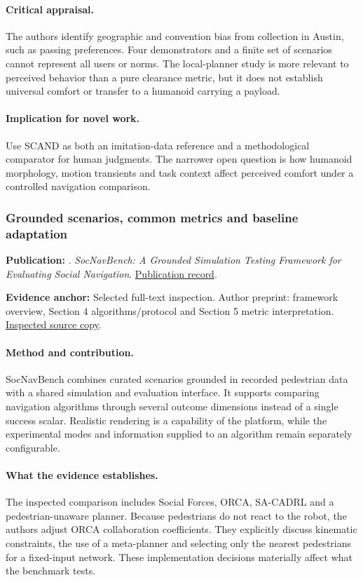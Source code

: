 \paragraph{Critical appraisal.} The authors identify geographic and convention bias from collection in Austin, such as passing preferences. Four demonstrators and a finite set of scenarios cannot represent all users or norms. The local-planner study is more relevant to perceived behavior than a pure clearance metric, but it does not establish universal comfort or transfer to a humanoid carrying a payload.

\paragraph{Implication for novel work.} Use SCAND as both an imitation-data reference and a methodological comparator for human judgments. The narrower open question is how humanoid morphology, motion transients and task context affect perceived comfort under a controlled navigation comparison.

\subsubsection{Grounded scenarios, common metrics and baseline adaptation}\label{paper:socnavbench}
\textbf{Publication:} \citet{socnavbench}. \emph{SocNavBench: A Grounded Simulation Testing Framework for Evaluating Social Navigation}. \href{https://doi.org/10.1145/3476413}{Publication record}.

\textbf{Evidence anchor:} Selected full-text inspection. Author preprint: framework overview, Section 4 algorithms/protocol and Section 5 metric interpretation. \href{https://arxiv.org/pdf/2103.00047}{Inspected source copy}.

\paragraph{Method and contribution.} SocNavBench combines curated scenarios grounded in recorded pedestrian data with a shared simulation and evaluation interface. It supports comparing navigation algorithms through several outcome dimensions instead of a single success scalar. Realistic rendering is a capability of the platform, while the experimental modes and information supplied to an algorithm remain separately configurable.

\paragraph{What the evidence establishes.} The inspected comparison includes Social Forces, ORCA, SA-CADRL and a pedestrian-unaware planner. Because pedestrians do not react to the robot, the authors adjust ORCA collaboration coefficients. They explicitly discuss kinematic constraints, the use of a meta-planner and selecting only the nearest pedestrians for a fixed-input network. These implementation decisions materially affect what the benchmark tests.

